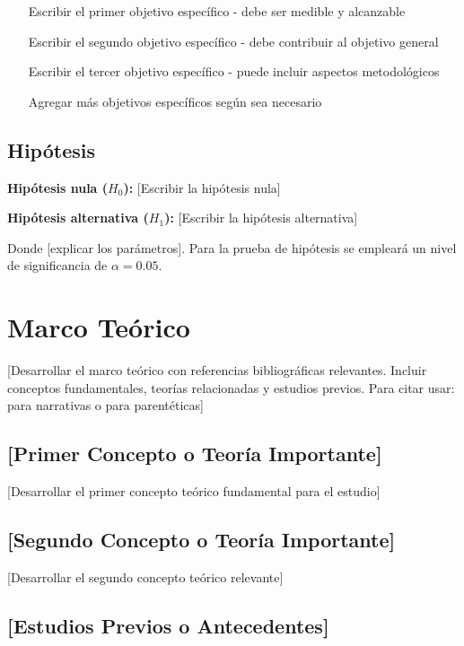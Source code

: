 \documentclass[12pt, letterpaper]{article}
\begin{document}
\begin{enumerate}
    \item [Escribir el primer objetivo específico - debe ser medible y alcanzable]
    \item [Escribir el segundo objetivo específico - debe contribuir al objetivo general]
    \item [Escribir el tercer objetivo específico - puede incluir aspectos metodológicos]
    \item [Agregar más objetivos específicos según sea necesario]
\end{enumerate}

\subsection{Hipótesis}

\textbf{Hipótesis nula ($H_{0}$):} [Escribir la hipótesis nula]

\textbf{Hipótesis alternativa ($H_{1}$):} [Escribir la hipótesis alternativa]

Donde [explicar los parámetros]. Para la prueba de hipótesis se empleará
un nivel de significancia de $\alpha = 0.05$.

\section{Marco Teórico}

 [Desarrollar el marco teórico con referencias bibliográficas relevantes. Incluir conceptos fundamentales, teorías relacionadas y estudios previos. Para citar usar: \textcite{autor2023} para narrativas o \parencite{autor2023} para parentéticas]

\subsection{[Primer Concepto o Teoría Importante]}

[Desarrollar el primer concepto teórico fundamental para el estudio]

\subsection{[Segundo Concepto o Teoría Importante]}

[Desarrollar el segundo concepto teórico relevante]

\subsection{[Estudios Previos o Antecedentes]}
\end{document}
